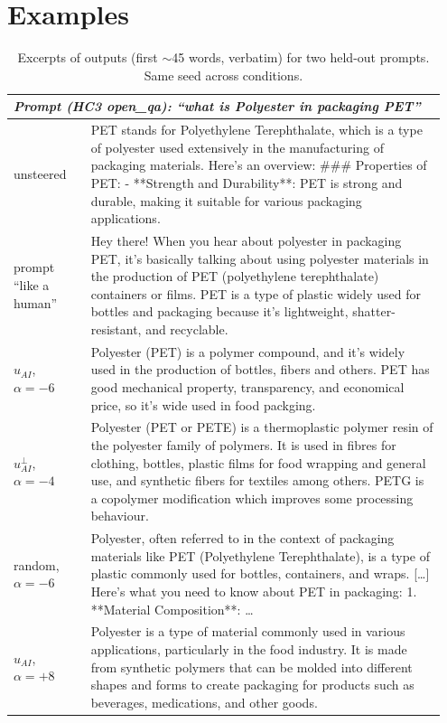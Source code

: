 \section{Examples}
\label{app:examples}

\begin{table}[h]
\centering\scriptsize
\caption{Excerpts of outputs (first $\sim$45 words, verbatim) for two held-out prompts. Same seed across conditions.}
\label{tab:examples}
\begin{tabular}{p{0.17\linewidth}p{0.78\linewidth}}
\toprule
\multicolumn{2}{l}{\emph{Prompt (HC3 open\_qa): ``what is Polyester in packaging PET''}}\\
\midrule
unsteered & PET stands for Polyethylene Terephthalate, which is a type of polyester used extensively in the manufacturing of packaging materials. Here's an overview: \#\#\# Properties of PET: - **Strength and Durability**: PET is strong and durable, making it suitable for various packaging applications.\\
prompt ``like a human'' & Hey there! When you hear about polyester in packaging PET, it's basically talking about using polyester materials in the production of PET (polyethylene terephthalate) containers or films. PET is a type of plastic widely used for bottles and packaging because it's lightweight, shatter-resistant, and recyclable.\\
$u_{AI}$, $\alpha{=}{-}6$ & Polyester (PET) is a polymer compound, and it's widely used in the production of bottles, fibers and others. PET has good mechanical property, transparency, and economical price, so it's wide used in food packging.\\
$u_{AI}^{\perp}$, $\alpha{=}{-}4$ & Polyester (PET or PETE) is a thermoplastic polymer resin of the polyester family of polymers. It is used in fibres for clothing, bottles, plastic films for food wrapping and general use, and synthetic fibers for textiles among others. PETG is a copolymer modification which improves some processing behaviour.\\
random, $\alpha{=}{-}6$ & Polyester, often referred to in the context of packaging materials like PET (Polyethylene Terephthalate), is a type of plastic commonly used for bottles, containers, and wraps. [\dots] Here's what you need to know about PET in packaging: 1. **Material Composition**: \dots\\
$u_{AI}$, $\alpha{=}{+}8$ & Polyester is a type of material commonly used in various applications, particularly in the food industry. It is made from synthetic polymers that can be molded into different shapes and forms to create packaging for products such as beverages, medications, and other goods.\\

\end{tabular}
\end{table}
